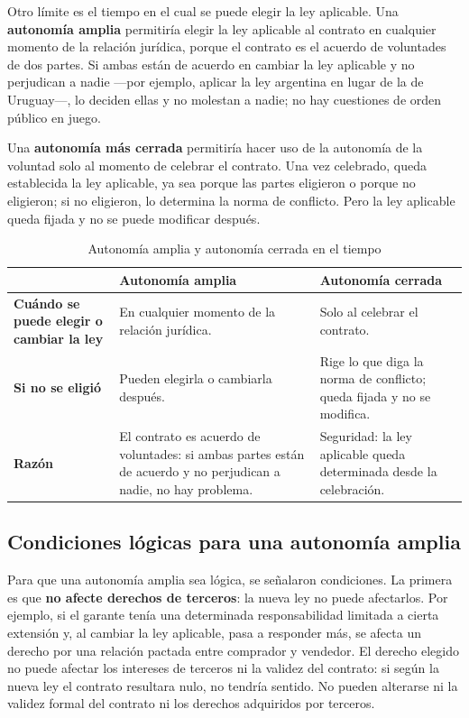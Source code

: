 \documentclass[12pt,oneside]{book}
\begin{document}
Otro l\'imite es el tiempo en el cual se puede elegir la ley aplicable. Una \textbf{autonom\'ia amplia} permitir\'ia elegir la ley aplicable al contrato en cualquier momento de la relaci\'on jur\'idica, porque el contrato es el acuerdo de voluntades de dos partes. Si ambas est\'an de acuerdo en cambiar la ley aplicable y no perjudican a nadie ---por ejemplo, aplicar la ley argentina en lugar de la de Uruguay---, lo deciden ellas y no molestan a nadie; no hay cuestiones de orden p\'ublico en juego.

Una \textbf{autonom\'ia m\'as cerrada} permitir\'ia hacer uso de la autonom\'ia de la voluntad solo al momento de celebrar el contrato. Una vez celebrado, queda establecida la ley aplicable, ya sea porque las partes eligieron o porque no eligieron; si no eligieron, lo determina la norma de conflicto. Pero la ley aplicable queda fijada y no se puede modificar despu\'es.

\begin{table}[H]
\centering
\caption{Autonom\'ia amplia y autonom\'ia cerrada en el tiempo}
\small
\begin{tabularx}{\textwidth}{
    >{\raggedright\arraybackslash}p{}
    >{\raggedright\arraybackslash}X
    >{\raggedright\arraybackslash}X
}
\toprule
 & \textbf{Autonom\'ia amplia} & \textbf{Autonom\'ia cerrada} \\
\midrule
\textbf{Cu\'ando se puede elegir o cambiar la ley} & En cualquier momento de la relaci\'on jur\'idica. & Solo al celebrar el contrato. \\
\addlinespace
\textbf{Si no se eligi\'o} & Pueden elegirla o cambiarla despu\'es. & Rige lo que diga la norma de conflicto; queda fijada y no se modifica. \\
\addlinespace
\textbf{Raz\'on} & El contrato es acuerdo de voluntades: si ambas partes est\'an de acuerdo y no perjudican a nadie, no hay problema. & Seguridad: la ley aplicable queda determinada desde la celebraci\'on. \\
\bottomrule
\end{tabularx}
\end{table}

\subsection{Condiciones l\'ogicas para una autonom\'ia amplia}

Para que una autonom\'ia amplia sea l\'ogica, se se\~nalaron condiciones. La primera es que \textbf{no afecte derechos de terceros}: la nueva ley no puede afectarlos. Por ejemplo, si el garante ten\'ia una determinada responsabilidad limitada a cierta extensi\'on y, al cambiar la ley aplicable, pasa a responder m\'as, se afecta un derecho por una relaci\'on pactada entre comprador y vendedor. El derecho elegido no puede afectar los intereses de terceros ni la validez del contrato: si seg\'un la nueva ley el contrato resultara nulo, no tendr\'ia sentido. No pueden alterarse ni la validez formal del contrato ni los derechos adquiridos por terceros.
\end{document}

